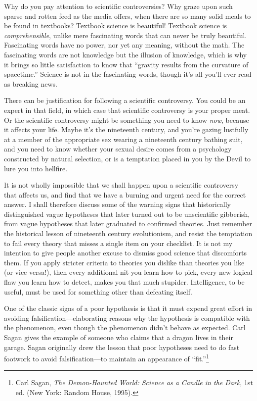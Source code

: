{
 Why do you pay attention to scientific controversies? Why graze
upon such sparse and rotten feed as the media offers, when there are so
many solid meals to be found in textbooks? Textbook science is
beautiful! Textbook science is \textit{comprehensible}, unlike mere
fascinating words that can never be truly beautiful. Fascinating words
have no power, nor yet any meaning, without the math. The fascinating
words are not knowledge but the illusion of knowledge, which is why it
brings so little satisfaction to know that ``gravity
results from the curvature of spacetime.'' Science is
not in the fascinating words, though it's all
you'll ever read as breaking news.}

{
 There can be justification for following a scientific controversy.
You could be an expert in that field, in which case that scientific
controversy is your proper meat. Or the scientific controversy might be
something you need to know \textit{now}, because it affects your life.
Maybe it's the nineteenth century, and
you're gazing lustfully at a member of the appropriate
sex wearing a nineteenth century bathing suit, and you need to know
whether your sexual desire comes from a psychology constructed by
natural selection, or is a temptation placed in you by the Devil to
lure you into hellfire.}

{
 It is not wholly impossible that we shall happen upon a scientific
controversy that affects us, and find that we have a burning and urgent
need for the correct answer. I shall therefore discuss some of the
warning signs that historically distinguished vague hypotheses that
later turned out to be unscientific gibberish, from vague hypotheses
that later graduated to confirmed theories. Just remember the
historical lesson of nineteenth century evolutionism, and resist the
temptation to fail every theory that misses a single item on your
checklist. It is not my intention to give people another excuse to
dismiss good science that discomforts them. If you apply stricter
criteria to theories you dislike than theories you like (or vice
versa!), then every additional nit you learn how to pick, every new
logical flaw you learn how to detect, makes you that much stupider.
Intelligence, to be useful, must be used for something other than
defeating itself.}

{
 One of the classic signs of a poor hypothesis is that it must
expend great effort in avoiding falsification---elaborating reasons why
the hypothesis is compatible with the phenomenon, even though the
phenomenon didn't behave as expected. Carl Sagan gives
the example of someone who claims that a dragon lives in their garage.
Sagan originally drew the lesson that poor hypotheses need to do fast
footwork to avoid falsification---to maintain an appearance of
``fit.''\footnote{Carl Sagan, \textit{The Demon-Haunted World: Science as a
Candle in the Dark}, 1st ed. (New York: Random House, 1995).}}

